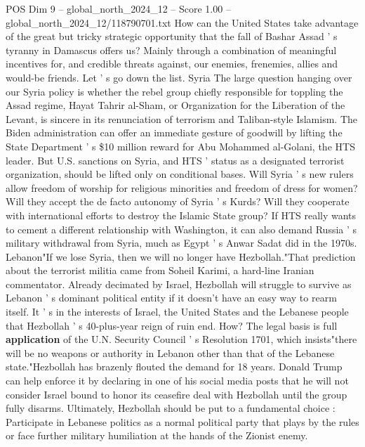 \begin{textsample}{POS Dim 9 – global\_north\_2024\_12 – Score 1.00 – global\_north\_2024\_12/118790701.txt}  \label{ex:f9_pos_330}
How can the United States take advantage of the great but tricky strategic opportunity that the fall of Bashar Assad ' s tyranny in Damascus offers us?
Mainly through a combination of meaningful incentives for, and credible threats against, our enemies, frenemies, allies and would-be friends.
Let ' s go down the list.
Syria The large question hanging over our Syria policy is whether the rebel group chiefly responsible for toppling the Assad regime, Hayat Tahrir al-Sham, or Organization for the Liberation of the Levant, is sincere in its renunciation of terrorism and Taliban-style Islamism.
The Biden administration can offer an immediate gesture of goodwill by lifting the State Department ' s \$10 million reward for Abu Mohammed al-Golani, the HTS leader.
But U.S. sanctions on Syria, and HTS ' status as a designated terrorist organization, should be lifted only on conditional bases.
Will Syria ' s new rulers allow freedom of worship for religious minorities and freedom of dress for women?
Will they accept the de facto autonomy of Syria ' s Kurds?
Will they cooperate with international efforts to destroy the Islamic State group?
If HTS really wants to cement a different relationship with Washington, it can also demand Russia ' s military withdrawal from Syria, much as Egypt ' s Anwar Sadat did in the 1970s.
Lebanon"If we lose Syria, then we will no longer have Hezbollah."That prediction about the terrorist militia came from Soheil Karimi, a hard-line Iranian commentator.
Already decimated by Israel, Hezbollah will struggle to survive as Lebanon ' s dominant political entity if it doesn't have an easy way to rearm itself.
It ' s in the interests of Israel, the United States and the Lebanese people that Hezbollah ' s 40-plus-year reign of ruin end.
How?
The legal basis is full \textbf{application} of the U.N.
Security Council ' s Resolution 1701, which insists"there will be no weapons or authority in Lebanon other than that of the Lebanese state."Hezbollah has brazenly flouted the demand for 18 years.
Donald Trump can help enforce it by declaring in one of his social media posts that he will not consider Israel bound to honor its ceasefire deal with Hezbollah until the group fully disarms.
Ultimately, Hezbollah should be put to a fundamental choice : Participate in Lebanese politics as a normal political party that plays by the rules or face further military humiliation at the hands of the Zionist enemy.

\end{textsample}
